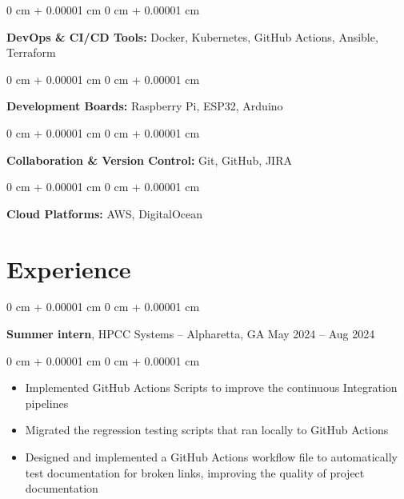 \documentclass[10pt, letterpaper]{article}
\newenvironment{highlights}{
    \begin{itemize}[
        topsep=0.10 cm,
        parsep=0.10 cm,
        partopsep=0pt,
        itemsep=0pt,
        leftmargin=0 cm + 10pt
    ]
}{
    \end{itemize}
} %
\newenvironment{onecolentry}{
    \begin{adjustwidth}{
        0 cm + 0.00001 cm
    }{
        0 cm + 0.00001 cm
    }
}{
    \end{adjustwidth}
} %
\newenvironment{twocolentry}[2][]{
    \onecolentry
    \def\secondColumn{#2}
    \setcolumnwidth{\fill, 4.5 cm}
    \begin{paracol}{2}
}{
    \switchcolumn \raggedleft \secondColumn
    \end{paracol}
    \endonecolentry
} %
\begin{document}
        \vspace{0.2 cm}

        \begin{onecolentry}
            \textbf{DevOps \& CI/CD Tools:} Docker, Kubernetes, GitHub Actions, Ansible, Terraform \end{onecolentry}

        \vspace{0.2 cm}
        
        \begin{onecolentry}
            \textbf{Development Boards:} Raspberry Pi, ESP32, Arduino \end{onecolentry}

        \vspace{0.2 cm}

        \begin{onecolentry}
            \textbf{Collaboration \& Version Control:} Git, GitHub, JIRA \end{onecolentry}

        \vspace{0.2 cm}

        \begin{onecolentry}
            \textbf{Cloud Platforms:} AWS, DigitalOcean \end{onecolentry}

    \section{Experience}

        \begin{twocolentry}{
            May 2024 – Aug 2024
        }
            \textbf{Summer intern}, HPCC Systems -- Alpharetta, GA\end{twocolentry}

        \vspace{0.10 cm}
        \begin{onecolentry}
            \begin{highlights}
                \item Implemented GitHub Actions Scripts to improve the continuous Integration pipelines
                \item Migrated the regression testing scripts that ran locally to GitHub Actions
                \item Designed and implemented a GitHub Actions workflow file to automatically test documentation for broken links, improving the quality of project documentation
            \end{highlights}
        \end{onecolentry}
\end{document}
